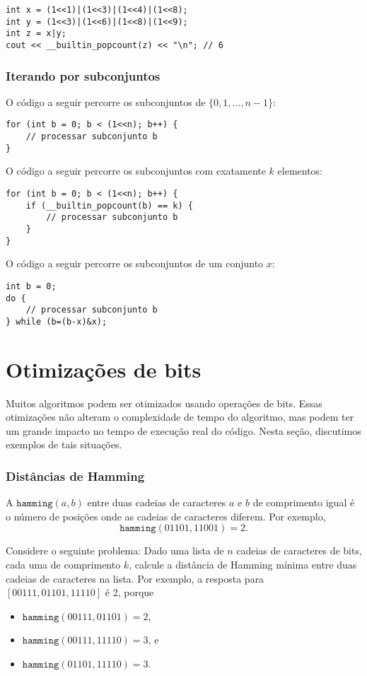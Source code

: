 \begin{lstlisting}
int x = (1<<1)|(1<<3)|(1<<4)|(1<<8);
int y = (1<<3)|(1<<6)|(1<<8)|(1<<9);
int z = x|y;
cout << __builtin_popcount(z) << "\n"; // 6
\end{lstlisting}

\subsubsection{Iterando por subconjuntos}

O código a seguir percorre
os subconjuntos de $\{0,1,\ldots,n-1\}$:

\begin{lstlisting}
for (int b = 0; b < (1<<n); b++) {
    // processar subconjunto b
}
\end{lstlisting}
O código a seguir percorre
os subconjuntos com exatamente $k$ elementos:
\begin{lstlisting}
for (int b = 0; b < (1<<n); b++) {
    if (__builtin_popcount(b) == k) {
        // processar subconjunto b
    }
}
\end{lstlisting}
O código a seguir percorre os subconjuntos
de um conjunto $x$:
\begin{lstlisting}
int b = 0;
do {
    // processar subconjunto b
} while (b=(b-x)&x);
\end{lstlisting}

\section{Otimizações de bits}

Muitos algoritmos podem ser otimizados usando
operações de bits.
Essas otimizações não alteram o
complexidade de tempo do algoritmo,
mas podem ter um grande impacto
no tempo de execução real do código.
Nesta seção, discutimos exemplos
de tais situações.

\subsubsection{Distâncias de Hamming}

A 
$\texttt{hamming}(a,b)$ entre duas
cadeias de caracteres $a$ e $b$ de comprimento igual é
o número de posições onde as cadeias de caracteres diferem.
Por exemplo,
\[\texttt{hamming}(01101,11001)=2.\]

Considere o seguinte problema: Dado
uma lista de $n$ cadeias de caracteres de bits, cada uma de comprimento $k$,
calcule a distância de Hamming mínima
entre duas cadeias de caracteres na lista.
Por exemplo, a resposta para $[00111,01101,11110]$
é 2, porque
\begin{itemize}[noitemsep]
\item $\texttt{hamming}(00111,01101)=2$,
\item $\texttt{hamming}(00111,11110)=3$, e
\item $\texttt{hamming}(01101,11110)=3$.
\end{itemize}

